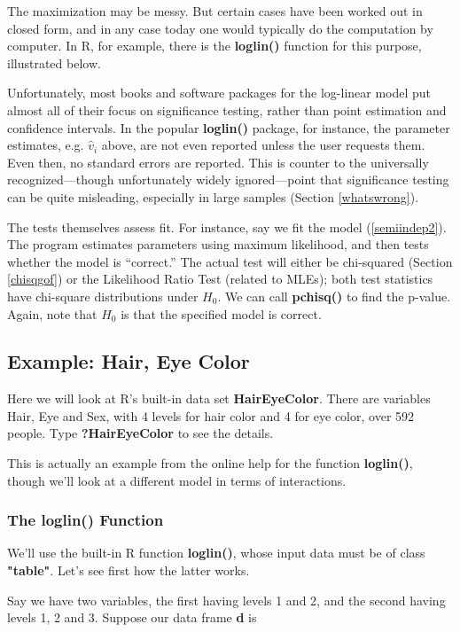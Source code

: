 The maximization may be messy.  But certain cases have been worked out
in closed form, and in any case today one would typically do the
computation by computer.  In R, for example, there is the {\bf loglin()}
function for this purpose, illustrated below.

Unfortunately, most books and software packages for the log-linear model
put almost all of their focus on significance testing, rather than point
estimation and confidence intervals.  In the popular {\bf loglin()}
package, for instance, the parameter estimates, e.g. $\hat{v}_i$ above,
are not even reported unless the user requests them.  Even then, no
standard errors are reported.  This is counter to the universally
recognized---though unfortunately widely ignored---point that
significance testing can be quite misleading, especially in large samples
(Section \ref{whatswrong}).

The tests themselves assess fit.  For instance, say we fit the model
(\ref{semiindep2}).  The program estimates parameters using maximum
likelihood, and then tests whether the model is ``correct.''  The actual
test will either be chi-squared (Section \ref{chisqgof}) or the
Likelihood Ratio Test (related to MLEs); both test statistics have
chi-square distributions under $H_0$.  We can call {\bf pchisq()} to
find the p-value.  Again, note that $H_0$ is that the specified model is
correct.

\subsection{Example:  Hair, Eye Color}

Here we will look at R's built-in data set {\bf HairEyeColor}.  There
are variables Hair, Eye and Sex, with 4 levels for hair color and 4 for
eye color, over 592 people.  Type {\bf ?HairEyeColor} to see the
details.

This is actually an example from the online help for the function
{\bf loglin()}, though we'll look at a different model in terms of
interactions.

\subsubsection{The loglin() Function}

We'll use the built-in R function {\bf loglin()}, whose input data must
be of class {\bf "table"}.  Let's see first how the latter works.

Say we have two variables, the first having levels 1 and 2, and the
second having levels 1, 2 and 3.  Suppose our data frame {\bf d} is

